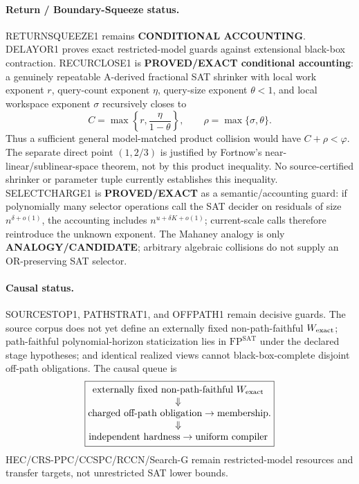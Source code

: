 \documentclass[11pt]{article}
\begin{document}
\paragraph{Return / Boundary-Squeeze status.}
RETURNSQUEEZE1 remains \textbf{CONDITIONAL ACCOUNTING}. DELAYOR1 proves exact restricted-model
guards against extensional black-box contraction. RECURCLOSE1 is \textbf{PROVED/EXACT
conditional accounting}: a genuinely repeatable A-derived fractional SAT shrinker with
local work exponent \(r\), query-count exponent \(\eta\), query-size exponent \(\theta<1\),
and local workspace exponent \(\sigma\) recursively closes to
\[
C=\max\left\{r,\frac{\eta}{1-\theta}\right\},
\qquad
\rho=\max\{\sigma,\theta\}.
\]
Thus a sufficient general model-matched product collision would have
\(C+\rho<\varphi\).  The separate direct point $(1,2/3)$ is justified by
Fortnow's near-linear/sublinear-space theorem, not by this product inequality.
No source-certified shrinker or parameter tuple currently establishes this inequality.
SELECTCHARGE1 is \textbf{PROVED/EXACT} as a semantic/accounting guard: if polynomially
many selector operations call the SAT decider on residuals of size \(n^{\delta+o(1)}\),
the accounting includes \(n^{u+\delta K+o(1)}\); current-scale calls therefore reintroduce
the unknown exponent. The Mahaney analogy is only \textbf{ANALOGY/CANDIDATE}; arbitrary
algebraic collisions do not supply an OR-preserving SAT selector.

\paragraph{Causal status.}
SOURCESTOP1, PATHSTRAT1, and OFFPATH1 remain decisive guards. The source corpus does not yet
define an externally fixed non-path-faithful \(W_{\rm exact}\); path-faithful polynomial-horizon
staticization lies in \(\mathrm{FP}^{\mathrm{SAT}}\) under the declared stage hypotheses; and
identical realized views cannot black-box-complete disjoint off-path obligations. The causal queue is
\[
\boxed{
\begin{gathered}
\text{externally fixed non-path-faithful }W_{\rm exact}
\\[-1mm]\Downarrow\\[-1mm]
\text{charged off-path obligation}\to\text{membership}
\\[-1mm]\Downarrow\\[-1mm]
\text{independent hardness}\to\text{uniform compiler}
\end{gathered}.}
\]
HEC/CRS-PPC/CCSPC/RCCN/Search-G remain restricted-model resources and transfer targets,
not unrestricted SAT lower bounds.
\end{document}
